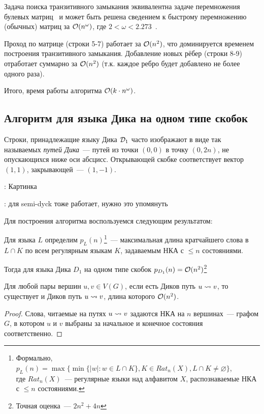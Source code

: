 Задача поиска транзитивного замыкания эквивалентна задаче перемножения булевых матриц~\cite{Aho1974} и может быть решена сведением к быстрому перемножению (обычных) матриц за $\mathcal{O}(n^\omega)$, где $2 < \omega < 2.273$~\cite{Alman20}.

Проход по матрице (строки 5-7) работает за $\mathcal{O}(n^2)$, что доминируется временем построения транзитивного замыкания. Добавление новых рёбер (строки 8-9) отработает суммарно за $\mathcal{O}(n^2)$ (т.к. каждое ребро будет добавлено не более одного раза).

Итого, время работы алгоритма $\mathcal{O}(k \cdot n^{\omega})$.

\subsection{Алгоритм для языка Дика на одном типе скобок}

\begin{note}
  Строки, принадлежащие языку Дика $\mathcal{D}_1$ часто изображают в виде так называемых \textit{путей Дика}~--- путей из точки $(0, 0)$ в точку $(0, 2n)$, не опускающихся ниже оси абсцисс. Открывающей скобке соответствует вектор $(1, 1)$, закрывающей~--- $(1, -1)$.

  \TODO: Картинка 
\end{note}

\TODO: для semi-dyck тоже работает, нужно это упомянуть

Для построения алгоритма воспользуемся следующим результатом:

\begin{lemma}

Для языка $L$ определим $p_L(n)$\footnote{Формально, $p_L(n) = \max \{ \min \{|w| \colon w \in L \cap K \}, K \in Rat_n(X), L \cap K \ne \varnothing \}$,\\ где $Rat_n(X)$~--- регулярные языки над алфавитом $X$, распознаваемые НКА с $\le n$ состояниями.}~--- максимальная длина кратчайшего слова в $L \cap K$ по всем регулярным языкам $K$, задаваемым НКА с $\le n$ состояниями.

Тогда для языка Дика $D_1$ на одном типе скобок $p_{D_1}(n) = \mathcal{O}(n^2)$\footnote{Точная оценка~--- $2n^2 + 4n$}
\end{lemma}

\begin{corollary}
    Для любой пары вершин $u, v \in V(G)$, если есть Диков путь $u \rightsquigarrow v$, то существует и Диков путь $u \rightsquigarrow v$, длина которого $\mathcal{O}(n^2)$.
\end{corollary}
\begin{proof}
    Слова, читаемые на путях $u \rightsquigarrow v$ задаются НКА на $n$ вершинах~--- графом $G$, в котором $u$ и $v$ выбраны за начальное и конечное состояния соответственно.
\end{proof}

